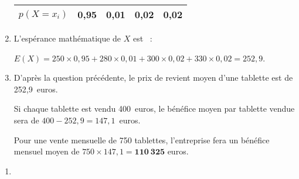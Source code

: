 \begin{corrige}
\begin{enumerate}
\begin{center}
\begin{tabular}{|c|c|c|c|c|}
                    \hline
                    $p(X=x_i)$ & 0,95 & 0,01 & 0,02 & 0,02 \\
                    \hline
               \end{tabular}
          \end{center}
          \par
          \par
          \item %
          L'espérance mathématique de $X$ est ~:
          \par
          $E(X)=250 \times 0,95 + 280 \times 0,01 + 300 \times 0,02 + 330 \times 0,02 = 252,9$.
          \par
          \par
          \item %
          D'après la question précédente, le prix de revient moyen d'une tablette est de 252,9~euros.
          \par
          Si chaque tablette est vendu 400~euros, le bénéfice moyen par tablette vendue sera de $400 - 252,9 = 147,1$~euros.
          \par
          Pour une vente mensuelle de 750 tablettes, l'entreprise fera un bénéfice mensuel moyen de $750 \times 147,1 =\bm{110\ 325}$ euros.
          \par
     \end{enumerate}
     \par
     \par
     \begin{enumerate}
          \par
          \item %

\end{enumerate}
\end{corrige}
